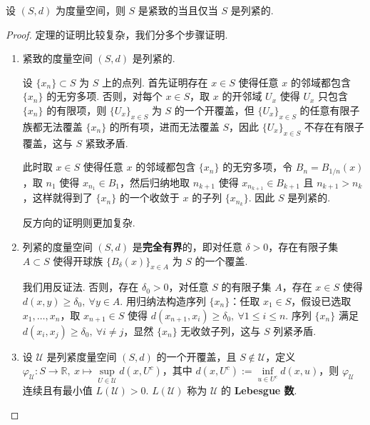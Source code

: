 \documentclass[../main.tex]{subfiles}
\begin{document}
\begin{theorem} \label{thm:compact-equiv-seqcompact-ms}
    设 $(S, d)$ 为度量空间，则 $S$ 是紧致的当且仅当 $S$ 是列紧的. 
\end{theorem}

\begin{proof}
    定理的证明比较复杂，我们分多个步骤证明. 

    \begin{enumerate}[label = (\arabic*)]
        \item 紧致的度量空间 $(S, d)$ 是列紧的. 
        
        设 $\{x_n\} \subset S$ 为 $S$ 上的点列. 首先证明存在 $x \in S$ 使得任意 $x$ 的邻域都包含 $\{x_n\}$ 的无穷多项. 否则，对每个 $x \in S$，取 $x$ 的开邻域 $U_x$ 使得 $U_x$ 只包含 $\{x_n\}$ 的有限项，则 $\{U_x\}_{x \in S}$ 为 $S$ 的一个开覆盖，但 $\{U_x\}_{x \in S}$ 的任意有限子族都无法覆盖 $\{x_n\}$ 的所有项，进而无法覆盖 $S$，因此 $\{U_x\}_{x \in S}$ 不存在有限子覆盖，这与 $S$ 紧致矛盾. 

        此时取 $x \in S$ 使得任意 $x$ 的邻域都包含 $\{x_n\}$ 的无穷多项，令 $B_n = B_{1 / n}(x)$，取 $n_1$ 使得 $x_{n_1} \in B_1$，然后归纳地取 $n_{k + 1}$ 使得 $x_{n_{k + 1}} \in B_{k + 1}$ 且 $n_{k + 1} > n_k$，这样就得到了 $\{x_n\}$ 的一个收敛于 $x$ 的子列 $\{x_{n_k}\}$. 因此 $S$ 是列紧的. 

        反方向的证明则更加复杂. 

        \item 列紧的度量空间 $(S, d)$ 是\textbf{完全有界}的，即对任意 $\delta > 0$，存在有限子集 $A \subset S$ 使得开球族 $\{B_\delta(x)\}_{x \in A}$ 为 $S$ 的一个覆盖. 
        
        我们用反证法. 否则，存在 $\delta_0 > 0$，对任意 $S$ 的有限子集 $A$，存在 $x \in S$ 使得 $d(x, y) \geqslant \delta_0,\ \forall y \in A$. 用归纳法构造序列 $\{x_n\}$：任取 $x_1 \in S$，假设已选取 $x_1, \dots, x_n$，取 $x_{n + 1} \in S$ 使得 $d(x_{n + 1}, x_i) \geqslant \delta_0,\ \forall 1 \leqslant i \leqslant n$. 序列 $\{x_n\}$ 满足 $d(x_i, x_j) \geqslant \delta_0,\ \forall i \neq j$，显然 $\{x_n\}$ 无收敛子列，这与 $S$ 列紧矛盾. 

        \item 设 $\mathcal{U}$ 是列紧度量空间 $(S, d)$ 的一个开覆盖，且 $S \notin \mathcal{U}$，定义 $\varphi_\mathcal{U}:S \to \mathbb R,\ x \mapsto \sup\limits_{U \in \mathcal{U}} d(x, U^c)$，其中 $d(x, U^c) := \inf\limits_{u \in U^c} d(x, u)$，则 $\varphi_\mathcal{U}$ 连续且有最小值 $L(\mathcal{U}) > 0$. $L(\mathcal{U})$ 称为 $\mathcal{U}$ 的 \textbf{Lebesgue 数}. 
        

\end{enumerate}
\end{proof}
\end{document}
